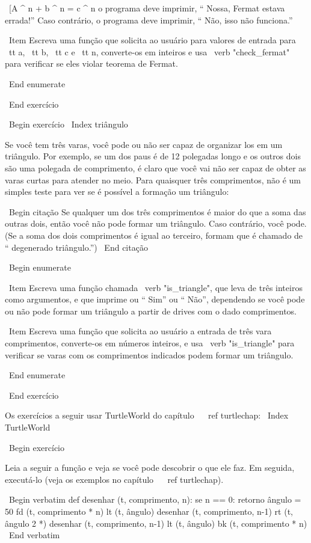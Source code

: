 \documentclass[10pt]{book}
\begin{document}
\begin {itemize}
{{{\ [A ^ n + b ^ n = c ^ n \]
%
o programa deve imprimir, `` Nossa, Fermat estava errada!''
Caso contrário, o programa deve imprimir, `` Não, isso não funciona.''

\ Item Escreva uma função que solicita ao usuário para valores de entrada
para {\ tt a}, {\ tt b}, {\ tt c} e {\ tt n}, converte-os em
inteiros e usa \ verb "check_fermat" para verificar se eles
violar teorema de Fermat.

\ End {enumerate}

\ End {} exercício


\ Begin {} exercício
\ Index {triângulo}

Se você tem três varas, você pode ou não ser capaz de organizar
los em um triângulo. Por exemplo, se um dos paus é de 12 polegadas
longo e os outros dois são uma polegada de comprimento, é claro que você vai
não ser capaz de obter as varas curtas para atender no meio. Para quaisquer
três comprimentos, não é um simples teste para ver se é possível a formação
um triângulo:

\ Begin {citação}
Se qualquer um dos três comprimentos é maior do que a soma das outras
  dois, então você não pode formar um triângulo. Caso contrário, você
  pode. (Se a soma dos dois comprimentos é igual ao terceiro, formam
    que é chamado de `` degenerado triângulo.'')
\ End {citação}

\ Begin {enumerate}

\ Item Escreva uma função chamada \ verb "is_triangle", que leva de três
  inteiros como argumentos, e que imprime ou `` Sim'' ou `` Não'', dependendo
  se você pode ou não pode formar um triângulo a partir de drives com o
  dado comprimentos.

\ Item Escreva uma função que solicita ao usuário a entrada de três vara
  comprimentos, converte-os em números inteiros, e usa \ verb "is_triangle" para
  verificar se varas com os comprimentos indicados podem formar um triângulo.

\ End {enumerate}

\ End {} exercício

Os exercícios a seguir usar TurtleWorld do capítulo ~ \ ref {} turtlechap:
\ Index {} TurtleWorld

\ Begin {} exercício

Leia a seguir a função e veja se você pode descobrir
o que ele faz. Em seguida, executá-lo (veja os exemplos no capítulo ~ \ ref {turtlechap}).

\ Begin {verbatim}
def desenhar (t, comprimento, n):
    se n == 0:
        retorno
    ângulo = 50
    fd (t, comprimento * n)
    lt (t, ângulo)
    desenhar (t, comprimento, n-1)
    rt (t, ângulo 2 *)
    desenhar (t, comprimento, n-1)
    lt (t, ângulo)
    bk (t, comprimento * n)
\ End {verbatim}

}}}
\end{itemize}
\end{document}
